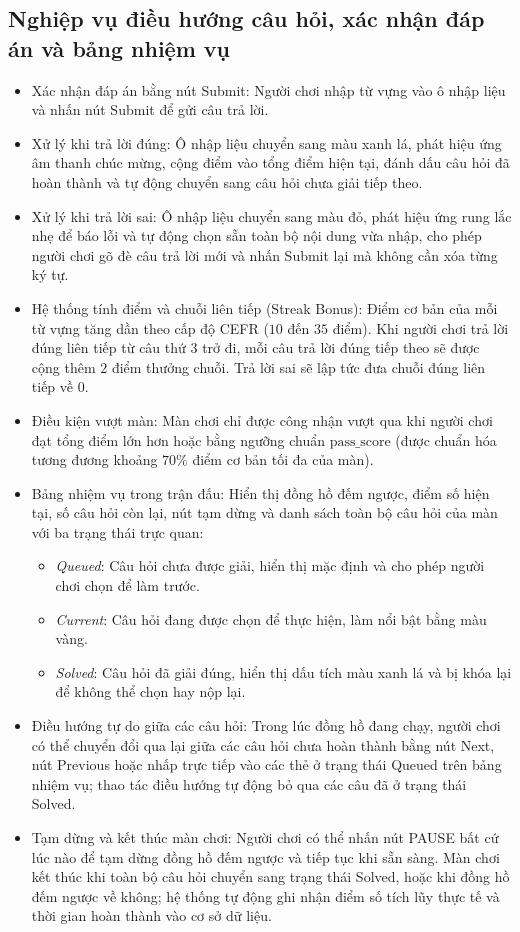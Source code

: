 \subsection{Nghiệp vụ điều hướng câu hỏi, xác nhận đáp án và bảng nhiệm vụ}
\label{subsec:navigation_and_hud}
\begin{itemize}
    \item Xác nhận đáp án bằng nút Submit: Người chơi nhập từ vựng vào ô nhập liệu và nhấn nút Submit để gửi câu trả lời.
    \item Xử lý khi trả lời đúng: Ô nhập liệu chuyển sang màu xanh lá, phát hiệu ứng âm thanh chúc mừng, cộng điểm vào tổng điểm hiện tại, đánh dấu câu hỏi đã hoàn thành và tự động chuyển sang câu hỏi chưa giải tiếp theo.
    \item Xử lý khi trả lời sai: Ô nhập liệu chuyển sang màu đỏ, phát hiệu ứng rung lắc nhẹ để báo lỗi và tự động chọn sẵn toàn bộ nội dung vừa nhập, cho phép người chơi gõ đè câu trả lời mới và nhấn Submit lại mà không cần xóa từng ký tự.
    \item Hệ thống tính điểm và chuỗi liên tiếp (Streak Bonus): Điểm cơ bản của mỗi từ vựng tăng dần theo cấp độ CEFR ($10$ đến $35$ điểm). Khi người chơi trả lời đúng liên tiếp từ câu thứ 3 trở đi, mỗi câu trả lời đúng tiếp theo sẽ được cộng thêm $2$ điểm thưởng chuỗi. Trả lời sai sẽ lập tức đưa chuỗi đúng liên tiếp về 0.
    \item Điều kiện vượt màn: Màn chơi chỉ được công nhận vượt qua khi người chơi đạt tổng điểm lớn hơn hoặc bằng ngưỡng chuẩn $\text{pass\_score}$ (được chuẩn hóa tương đương khoảng $70\%$ điểm cơ bản tối đa của màn).
    \item Bảng nhiệm vụ trong trận đấu: Hiển thị đồng hồ đếm ngược, điểm số hiện tại, số câu hỏi còn lại, nút tạm dừng và danh sách toàn bộ câu hỏi của màn với ba trạng thái trực quan:
    \begin{itemize}
        \item \textit{Queued}: Câu hỏi chưa được giải, hiển thị mặc định và cho phép người chơi chọn để làm trước.
        \item \textit{Current}: Câu hỏi đang được chọn để thực hiện, làm nổi bật bằng màu vàng.
        \item \textit{Solved}: Câu hỏi đã giải đúng, hiển thị dấu tích màu xanh lá và bị khóa lại để không thể chọn hay nộp lại.
    \end{itemize}
    \item Điều hướng tự do giữa các câu hỏi: Trong lúc đồng hồ đang chạy, người chơi có thể chuyển đổi qua lại giữa các câu hỏi chưa hoàn thành bằng nút Next, nút Previous hoặc nhấp trực tiếp vào các thẻ ở trạng thái Queued trên bảng nhiệm vụ; thao tác điều hướng tự động bỏ qua các câu đã ở trạng thái Solved.
    \item Tạm dừng và kết thúc màn chơi: Người chơi có thể nhấn nút PAUSE bất cứ lúc nào để tạm dừng đồng hồ đếm ngược và tiếp tục khi sẵn sàng. Màn chơi kết thúc khi toàn bộ câu hỏi chuyển sang trạng thái Solved, hoặc khi đồng hồ đếm ngược về không; hệ thống tự động ghi nhận điểm số tích lũy thực tế và thời gian hoàn thành vào cơ sở dữ liệu.
\end{itemize}

